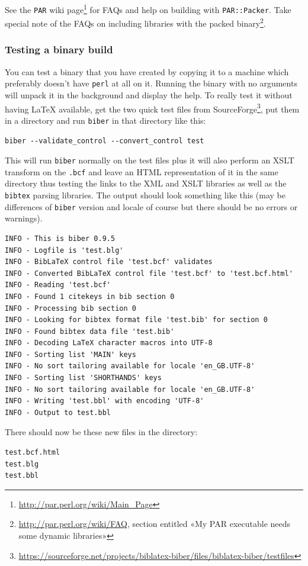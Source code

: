 \documentclass{ltxdockit}
\begin{document}
See the \verb+PAR+ wiki
page\footnote{\url{http://par.perl.org/wiki/Main_Page}} for FAQs and help
on building with \verb+PAR::Packer+. Take special note of the FAQs on
including libraries with the packed
binary\footnote{\url{http://par.perl.org/wiki/FAQ}, section entitled «My
  PAR executable needs some dynamic libraries»}.

\subsubsection{Testing a binary build}
You can test a binary that you have created by copying it to a machine
which preferably doesn't have \verb+perl+ at all on it. Running the binary with no
arguments will unpack it in the background and display the help. To really
test it without having LaTeX available, get the two quick test files from
SourceForge\footnote{\url{https://sourceforge.net/projects/biblatex-biber/files/biblatex-biber/testfiles}},
put them in a directory and run \verb+biber+ in that directory like this:

\begin{verbatim}
biber --validate_control --convert_control test
\end{verbatim}

\noindent This will run \verb+biber+ normally on the test files plus it
will also perform an XSLT transform on the \verb+.bcf+ and
leave an HTML representation of it in the same directory thus testing the
links to the XML and XSLT libraries as well as the \verb+bibtex+ parsing
libraries. The output should look something like this (may be differences
of \verb+biber+ version and locale of course but there should be no errors
or warnings).

\begin{verbatim}
INFO - This is biber 0.9.5
INFO - Logfile is 'test.blg'
INFO - BibLaTeX control file 'test.bcf' validates
INFO - Converted BibLaTeX control file 'test.bcf' to 'test.bcf.html'
INFO - Reading 'test.bcf'
INFO - Found 1 citekeys in bib section 0
INFO - Processing bib section 0
INFO - Looking for bibtex format file 'test.bib' for section 0
INFO - Found bibtex data file 'test.bib'
INFO - Decoding LaTeX character macros into UTF-8
INFO - Sorting list 'MAIN' keys
INFO - No sort tailoring available for locale 'en_GB.UTF-8'
INFO - Sorting list 'SHORTHANDS' keys
INFO - No sort tailoring available for locale 'en_GB.UTF-8'
INFO - Writing 'test.bbl' with encoding 'UTF-8'
INFO - Output to test.bbl
\end{verbatim}

\noindent There should now be these new files in the directory:

\begin{verbatim}
test.bcf.html
test.blg
test.bbl
\end{verbatim}
\end{document}
